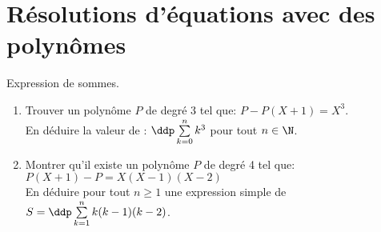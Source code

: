 \documentclass[a4paper, 11pt,reqno]{article}
\begin{document}
\noindent\section{\large{R\'esolutions d'\'equations avec des polyn\^{o}mes}}
\begin{exercice}   \;
	Expression de sommes.
	\begin{enumerate}
		\item Trouver un polyn\^ome $P$ de degr\'e 3 tel que: $P-P(X+1)=X^3$.\\
		      \noindent En d\'eduire la valeur de : $\ddp \sum\limits_{k=0}^n k^3$ pour tout $n\in\N$.
		\item Montrer qu'il existe un polyn\^ome $P$ de degr\'e 4 tel que: $P(X+1)-P=X(X-1)(X-2)$\\
		      \noindent En d\'eduire pour tout $n\geq 1$ une expression simple de $S=\ddp\sum\limits_{k=1}^n k(k-1)(k-2)$.
	\end{enumerate}
\end{exercice}
\end{document}
